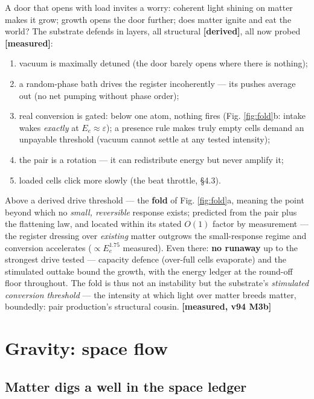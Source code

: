 A door that opens with load invites a worry: coherent light shining on
matter makes it grow; growth opens the door further; does matter ignite
and eat the world? The substrate defends in layers, all structural
\textbf{{[}derived{]}}, all now probed \textbf{{[}measured{]}}:

\begin{enumerate}
\def\labelenumi{\arabic{enumi}.}
\tightlist
\item
  vacuum is maximally detuned (the door barely opens where there is
  nothing);
\item
  a random-phase bath drives the register incoherently --- its pushes
  average out (no net pumping without phase order);
\item
  real conversion is gated: below one atom, nothing fires (Fig.
  \ref{fig:fold}b: intake wakes \emph{exactly} at
  \(E_e \approx \varepsilon\)); a presence rule makes truly empty cells
  demand an unpayable threshold (vacuum cannot settle at any tested
  intensity);
\item
  the pair is a rotation --- it can redistribute energy but never
  amplify it;
\item
  loaded cells click more slowly (the beat throttle, §4.3).
\end{enumerate}

Above a derived drive threshold --- the \textbf{fold} of Fig.
\ref{fig:fold}a, meaning the point beyond which no \emph{small,
reversible} response exists; predicted from the pair plus the flattening
law, and located within its stated \(O(1)\) factor by measurement ---
the register dressing over \emph{existing} matter outgrows the
small-response regime and conversion accelerates (\(\propto E_e^{1.75}\)
measured). Even there: \textbf{no runaway} up to the strongest drive
tested --- capacity defence (over-full cells evaporate) and the
stimulated outtake bound the growth, with the energy ledger at the
round-off floor throughout. The fold is thus not an instability but the
substrate's \emph{stimulated conversion threshold} --- the intensity at
which light over matter breeds matter, boundedly: pair production's
structural cousin. \textbf{{[}measured, v94 M3b{]}}

\section{Gravity: space flow}\label{gravity-space-flow}

\subsection{Matter digs a well in the space
ledger}\label{matter-digs-a-well-in-the-space-ledger}

